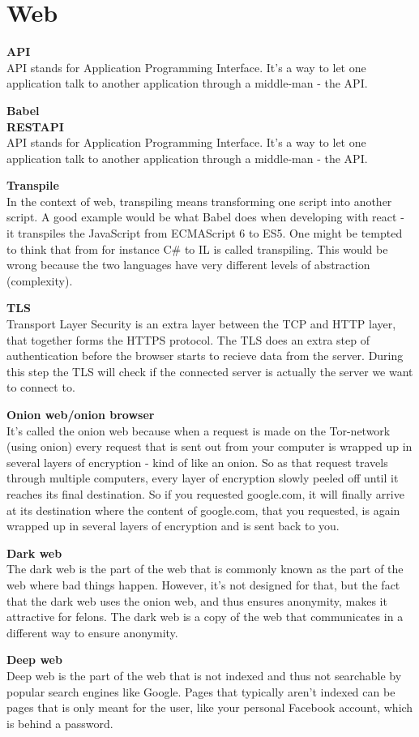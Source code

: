 \section{Web}

\textbf{API} \\
API stands for Application Programming Interface. It's a way to let one application talk to another application through a middle-man - the API. 

\textbf{Babel} \\


\textbf{RESTAPI} \\
API stands for Application Programming Interface. It's a way to let one application talk to another application through a middle-man - the API. 

\textbf{Transpile} \\
In the context of web, transpiling means transforming one script into another script. A good example would be what Babel does when developing with react - it transpiles the JavaScript from ECMAScript 6 to ES5. One might be tempted to think that from for instance C\# to IL is called transpiling. This would be wrong because the two languages have very different levels of abstraction (complexity). 

\textbf{TLS} \\ 
Transport Layer Security is an extra layer between the TCP and HTTP layer, that together forms the HTTPS protocol. The TLS does an extra step of authentication before the browser starts to recieve data from the server. During this step the TLS will check if the connected server is actually the server we want to connect to. \cite{web:ssl}


\textbf{Onion web/onion browser} \\
It's called the onion web because when a request is made on the Tor-network (using onion) every request that is sent out from your computer is wrapped up in several layers of encryption - kind of like an onion. So as that request travels through multiple computers, every layer of encryption slowly peeled off until it reaches its final destination. So if you requested google.com, it will finally arrive at its destination where the content of google.com, that you requested, is again wrapped up in several layers of encryption and is sent back to you. 

\textbf{Dark web} \\
The dark web is the part of the web that is commonly known as the part of the web where bad things happen. However, it's not designed for that, but the fact that the dark web uses the onion web, and thus ensures anonymity, makes it attractive for felons. The dark web is a copy of the web that communicates in a different way to ensure anonymity. \cite{web:darkWeb}


\textbf{Deep web} \\
Deep web is the part of the web that is not indexed and thus not searchable by popular search engines like Google. Pages that typically aren't indexed can be pages that is only meant for the user, like your personal Facebook account, which is behind a password.